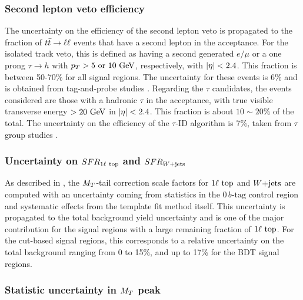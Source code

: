     \subsubsection{Second lepton veto efficiency}

    The uncertainty on the efficiency of the second lepton veto is propagated to the
    fraction of $t\bar{t} \rightarrow \ell \ell$ events that have a second lepton in the acceptance. For
    the isolated track veto, this is defined as having a second generated
    $e/\mu$ or a one prong $\tau \rightarrow h$ with $p_T > 5 \text{ or } 10 ~\text{GeV}$,
    respectively, with $\left| \eta \right| < 2.4$. This fraction is between 50-70\% for all
    signal regions. The uncertainty for these events is 6\% and is obtained from
    tag-and-probe studies \cite{AN-2013-89}. Regarding the $\tau$ candidates, the
    events considered are those with a hadronic $\tau$ in the acceptance, with
    true visible transverse energy $> 20~\text{GeV}$ in $\left| \eta \right| < 2.4$. This fraction is
    about $10 \sim 20 \%$ of the total. The uncertainty on the efficiency of the
    $\tau$-ID algorithm is 7\%, taken from $\tau$ group studies \cite{TauID}.

    \subsubsection{Uncertainty on $SFR_{1\ell~\text{top}}$ and $SFR_{\text{$W$+jets}}$}

    As described in , the $M_T$-tail correction
    scale factors for $1\ell~\text{top}$ and $\text{$W$+jets}$ are computed with an uncertainty
    coming from statistics in the $0\, b\text{-tag}$ control region and systematic
    effects from the template fit method itself. This uncertainty is propagated
    to the total background yield uncertainty and is one of the major contribution
    for the signal regions with a large remaining fraction of $1\ell~\text{top}$.
    For the cut-based signal regions, this corresponds to a relative uncertainty
    on the total background ranging from 0 to 15\%, and up to 17\% for the BDT
    signal regions.

    \subsubsection{Statistic uncertainty in $M_T$ peak}

